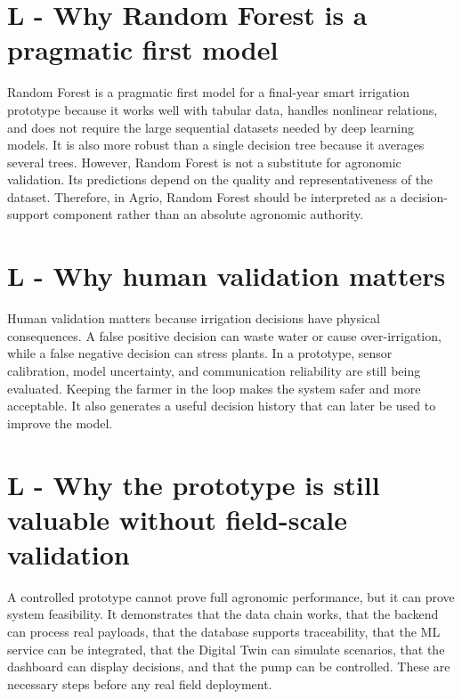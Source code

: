 \section{L - Why Random Forest is a pragmatic first model}

Random Forest is a pragmatic first model for a final-year smart irrigation prototype because it works well with tabular data, handles nonlinear relations, and does not require the large sequential datasets needed by deep learning models. It is also more robust than a single decision tree because it averages several trees. However, Random Forest is not a substitute for agronomic validation. Its predictions depend on the quality and representativeness of the dataset. Therefore, in Agrio, Random Forest should be interpreted as a decision-support component rather than an absolute agronomic authority.

\section{L - Why human validation matters}

Human validation matters because irrigation decisions have physical consequences. A false positive decision can waste water or cause over-irrigation, while a false negative decision can stress plants. In a prototype, sensor calibration, model uncertainty, and communication reliability are still being evaluated. Keeping the farmer in the loop makes the system safer and more acceptable. It also generates a useful decision history that can later be used to improve the model.

\section{L - Why the prototype is still valuable without field-scale validation}

A controlled prototype cannot prove full agronomic performance, but it can prove system feasibility. It demonstrates that the data chain works, that the backend can process real payloads, that the database supports traceability, that the ML service can be integrated, that the Digital Twin can simulate scenarios, that the dashboard can display decisions, and that the pump can be controlled. These are necessary steps before any real field deployment.

